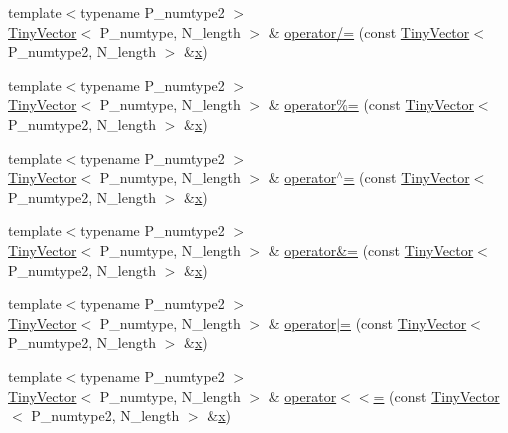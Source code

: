 \begin{DoxyCompactItemize}
{\footnotesize template$<$typename P\+\_\+numtype2 $>$ }\\\hyperlink{classTinyVector}{Tiny\+Vector}$<$ P\+\_\+numtype, N\+\_\+length $>$ \& \hyperlink{classTinyVector_ac589f0cf2f0b2cee7410cb640d176b33}{operator/=} (const \hyperlink{classTinyVector}{Tiny\+Vector}$<$ P\+\_\+numtype2, N\+\_\+length $>$ \&\hyperlink{vecnorm1_8cc_ac73eed9e41ec09d58f112f06c2d6cb63}{x})
\item 
{\footnotesize template$<$typename P\+\_\+numtype2 $>$ }\\\hyperlink{classTinyVector}{Tiny\+Vector}$<$ P\+\_\+numtype, N\+\_\+length $>$ \& \hyperlink{classTinyVector_a6aac02a7a445554c8bc80b7721a16eae}{operator\%=} (const \hyperlink{classTinyVector}{Tiny\+Vector}$<$ P\+\_\+numtype2, N\+\_\+length $>$ \&\hyperlink{vecnorm1_8cc_ac73eed9e41ec09d58f112f06c2d6cb63}{x})
\item 
{\footnotesize template$<$typename P\+\_\+numtype2 $>$ }\\\hyperlink{classTinyVector}{Tiny\+Vector}$<$ P\+\_\+numtype, N\+\_\+length $>$ \& \hyperlink{classTinyVector_a1577ee6c91aa3bcd8223a14559c875fd}{operator$^\wedge$=} (const \hyperlink{classTinyVector}{Tiny\+Vector}$<$ P\+\_\+numtype2, N\+\_\+length $>$ \&\hyperlink{vecnorm1_8cc_ac73eed9e41ec09d58f112f06c2d6cb63}{x})
\item 
{\footnotesize template$<$typename P\+\_\+numtype2 $>$ }\\\hyperlink{classTinyVector}{Tiny\+Vector}$<$ P\+\_\+numtype, N\+\_\+length $>$ \& \hyperlink{classTinyVector_abecb7f37dbb2602903fb18273e0302a6}{operator\&=} (const \hyperlink{classTinyVector}{Tiny\+Vector}$<$ P\+\_\+numtype2, N\+\_\+length $>$ \&\hyperlink{vecnorm1_8cc_ac73eed9e41ec09d58f112f06c2d6cb63}{x})
\item 
{\footnotesize template$<$typename P\+\_\+numtype2 $>$ }\\\hyperlink{classTinyVector}{Tiny\+Vector}$<$ P\+\_\+numtype, N\+\_\+length $>$ \& \hyperlink{classTinyVector_af67615ee40efa019fecfc05957408242}{operator$\vert$=} (const \hyperlink{classTinyVector}{Tiny\+Vector}$<$ P\+\_\+numtype2, N\+\_\+length $>$ \&\hyperlink{vecnorm1_8cc_ac73eed9e41ec09d58f112f06c2d6cb63}{x})
\item 
{\footnotesize template$<$typename P\+\_\+numtype2 $>$ }\\\hyperlink{classTinyVector}{Tiny\+Vector}$<$ P\+\_\+numtype, N\+\_\+length $>$ \& \hyperlink{classTinyVector_a525f8f555249ffa9be325634a8c4c051}{operator$<$$<$=} (const \hyperlink{classTinyVector}{Tiny\+Vector}$<$ P\+\_\+numtype2, N\+\_\+length $>$ \&\hyperlink{vecnorm1_8cc_ac73eed9e41ec09d58f112f06c2d6cb63}{x})

\end{DoxyCompactItemize}
